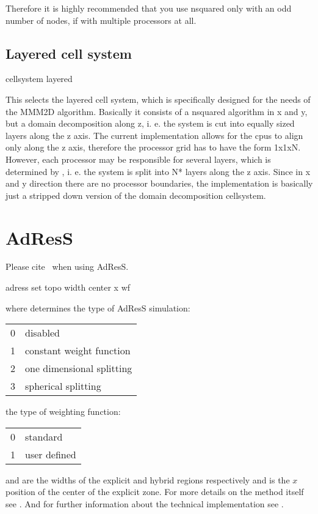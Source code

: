 Therefore it is highly recommended that you use nsquared only with an
odd number of nodes, if with multiple processors at all. 

\subsection{Layered cell system}
\begin{essyntax}
  cellsystem layered 
\end{essyntax}

This selects the layered cell system, which is specifically designed
for the needs of the MMM2D algorithm. Basically it consists of a
nsquared algorithm in x and y, but a domain decomposition along z, i.
e. the system is cut into equally sized layers along the z axis. The
current implementation allows for the cpus to align only along the z
axis, therefore the processor grid has to have the form 1x1xN.
However, each processor may be responsible for several layers, which
is determined by , i. e. the system is split into
N* layers along the z axis. Since in x and y direction
there are no processor boundaries, the implementation is basically
just a stripped down version of the domain decomposition cellsystem.

\section{AdResS}

\begin{citebox}
  Please cite~ when using AdResS.
\end{citebox}

\begin{essyntax}
adress set topo  width   center x  wf 
\begin{features}
  \end{features}
\end{essyntax}

where  determines the type of AdResS simulation:\newline
\begin{tabular}{ll}
0&disabled\\
1&constant weight function\\
2&one dimensional splitting\\
3&spherical splitting
\end{tabular}\newline
{} the type of weighting function:\newline
\begin{tabular}{ll}
0&standard\\
1&user defined
\end{tabular}\newline
{} and  are the widths of the explicit and hybrid regions respectively and  is the $x$ position of the center of the explicit zone.
For more details on the method itself see \cite{praprotnik05,praprotnik08,poblete10}.
And for further information about the technical implementation see \cite{adress}.

